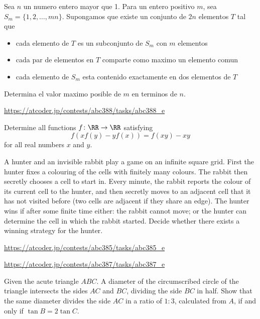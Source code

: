\documentclass[11pt]{scrartcl}
\begin{document}
\begin{problem}
Sea $n$ un numero entero mayor que 1. Para un entero positivo $m$, sea $S_m=\{ 1,2,\ldots ,mn \}.$ Supongamos que existe un conjunto de $2n$ elementos $T$ tal que 
\begin{itemize}
\item cada elemento de $T$ es un subconjunto de $S_m$ con $m$ elementos
\item cada par de elementos en $T$ comparte como maximo un elemento comun
\item cada elemento de $S_m$ esta contenido exactamente en dos elementos de $T$
\end{itemize}
Determina el valor maximo posible de $m$ en terminos de $n$.
\end{problem}
\begin{problem}[AC ABC388E]
\url{https://atcoder.jp/contests/abc388/tasks/abc388_e}
\end{problem}
\begin{problem}
  Determine all functions $f \colon \RR \to \RR$ satisfying
  \[ f\left( xf(y)-yf(x) \right) = f(xy)-xy \]
  for all real numbers $x$ and $y$.

\end{problem}
\begin{problem}
	A hunter and an invisible rabbit play a game on an infinite square grid. First the hunter fixes a colouring of the cells with finitely many colours. The rabbit then secretly chooses a cell to start in. Every minute, the rabbit reports the colour of its current cell to the hunter, and then secretly moves to an adjacent cell that it has not visited before (two cells are adjacent if they share an edge). The hunter wins if after some finite time either:
the rabbit cannot move; or
the hunter can determine the cell in which the rabbit started.
Decide whether there exists a winning strategy for the hunter.
\end{problem}
\begin{problem}[AC ABC385E]
\url{https://atcoder.jp/contests/abc385/tasks/abc385_e}
\end{problem}
\begin{problem}[AC ABC387E]
\url{https://atcoder.jp/contests/abc387/tasks/abc387_e}
\end{problem}
\begin{problem}[Swedish 2015/1]
Given the acute triangle $ABC$. A diameter of the circumscribed circle of the triangle intersects the sides $AC$ and $BC$, dividing the side $BC$ in half. Show that the same diameter divides the side $AC$ in a ratio of $1: 3$, calculated from $A$, if and only if $\tan B = 2 \tan C$.
\end{problem}
\end{document}
